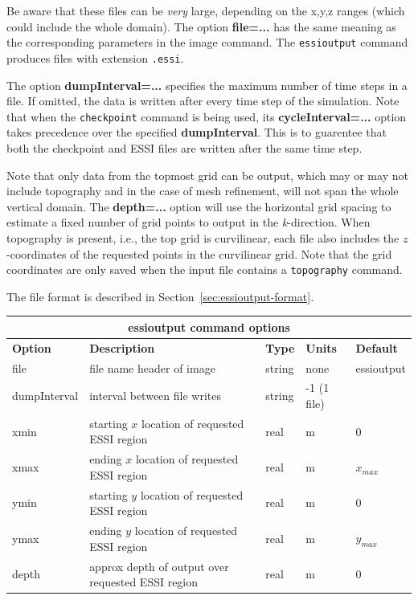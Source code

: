 \documentclass[11pt]{report}
\begin{document}
Be aware that these files can be {\em very} large, depending on the
  x,y,z ranges (which could include the whole domain).
The option {\bf file=...} has the
  same meaning as the corresponding parameters in the image command.
The \verb+essioutput+ command produces files with extension \verb+.essi+.

The option {\bf dumpInterval=...} specifies the maximum 
number of time steps in a file. If omitted, the data is written after
every time step of the simulation.
Note that when the \verb+checkpoint+ command is
being used, its {\bf cycleInterval=...} option takes precedence over
the specified {\bf dumpInterval}. This is to guarentee that both the
checkpoint and ESSI files are written after the same time step.

Note that only data from the topmost grid can be output, which may or may
  not include topography and in the case of mesh refinement, will not
  span the whole vertical domain.
The {\bf depth=...} option will use the horizontal grid spacing to estimate a 
  fixed number of grid points to output in the {\emph k-}direction.
When topography is present, i.e., the top grid is curvilinear, each file also 
  includes the $z$-coordinates of the requested points in the curvilinear grid.
Note that the grid coordinates are only saved when the
  input file contains a \verb+topography+ command.

The file format is described in Section~\ref{sec:essioutput-format}.
%
\begin{center}
\begin{tabular}{|l|p{8cm}|l|l|l|} \hline
\multicolumn{5}{|c|}{\bf essioutput command options}\\ \hline
{\bf Option} & {\bf Description}          & {\bf Type} & {\bf Units} & {\bf Default} \\ \hline
\hline
file        & file name header of image                          & string & none
  & essioutput \\ \hline
  dumpInterval & interval between file writes & string & -1 (1 file) \\ \hline
xmin     & starting $x$ location of requested ESSI region & real & m & 0 \\ \hline
xmax     & ending $x$ location of requested ESSI region & real & m & $x_{max}$ \\ \hline
ymin     & starting $y$ location of requested ESSI region & real & m & 0 \\ \hline
ymax     & ending $y$ location of requested ESSI region & real & m & $y_{max}$ \\ \hline
depth     & approx depth of output over requested ESSI region & real & m & 0 \\ \hline
\end{tabular}
\end{center}
\end{document}
